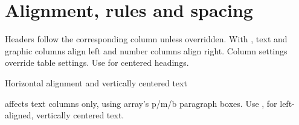 \section{Alignment, rules and spacing}
Headers follow the corresponding column unless overridden. With ,
text and graphic columns align left and number columns align right. Column
settings override table settings. Use  for centered headings.
\begin{demo}{Horizontal alignment and vertically centered text}
\begin{center}
\begin{gradtable}[align=c,header align=c,rules=grid,valign=c,
  text width=30mm,column sep=5pt,row padding=3pt,
  header color=gradbarsBlue!8,rule color=gradbarsBlue!60!black]
\end{gradtable}
\end{center}
\end{demo}
 affects text columns only, using array's p/m/b paragraph boxes.
Use , for left-aligned, vertically centered text.


